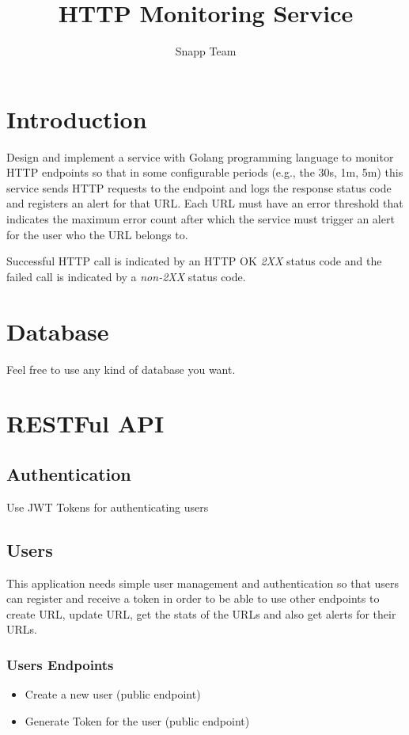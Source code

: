 \documentclass{article}
\begin{document}
\title{HTTP Monitoring Service}
\author{Snapp Team}

\maketitle
\tableofcontents

\section{Introduction}
Design and implement a service with Golang programming language to monitor HTTP endpoints so that in some configurable periods (e.g., the 30s, 1m, 5m)
this service sends HTTP requests to the endpoint and logs the response status code and registers an alert for that URL.
Each URL must have an error threshold that indicates the maximum error count after which the service must trigger an alert for the user who the URL belongs to.

Successful HTTP call is indicated by an HTTP OK \textit{2XX} status code and the failed call is indicated by a \textit{non-2XX} status code.

\section{Database}

Feel free to use any kind of database you want.

\section{RESTFul API}
\subsection{Authentication}
Use JWT Tokens for authenticating users

\subsection{Users}
This application needs simple user management and authentication so that users can register and receive a token in order to be able to use other endpoints to create URL, update URL, get the stats of the URLs and also get alerts for their URLs.

\subsubsection{Users Endpoints}
\begin{itemize}
  \item Create a new user (public endpoint)
  \item Generate Token for the user (public endpoint)
\end{itemize}
\end{document}
